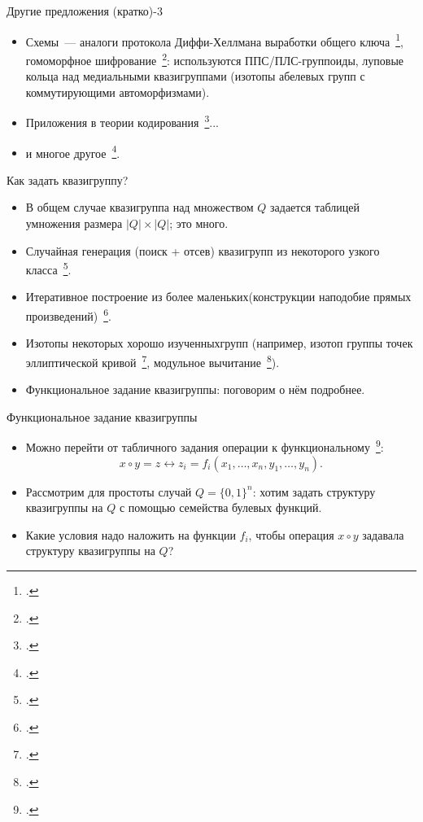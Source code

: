 \begin{frame}{Другие предложения (кратко)-3}
    \begin{itemize}
        \item Схемы~--- аналоги протокола Диффи-Хеллмана выработки общего ключа~\footcite{katyshev14, katyshev18}, гомоморфное шифрование~\footcite{gribov2010construction, gribov15, markov20}: используются ППС/ПЛС-группоиды, луповые кольца над медиальными квазигруппами (изотопы абелевых групп с коммутирующими автоморфизмами).
        \pause
        \item Приложения в теории кодирования~\footcite{nechaev98, nechaev04, couselo2004loop, markov12, markov2020nonassociative}...
        \pause 
        \item и многое другое~\footcite{glukhov, artamonov18, shcherbacov2017elements}.
    \end{itemize}
\end{frame}


\begin{frame}{Как задать квазигруппу?}
    \begin{itemize}
        \item В общем случае квазигруппа над множеством $Q$ задается таблицей умножения размера $\lvert Q \rvert \times \lvert Q \rvert$; это много.
        \pause 
        \item Случайная генерация (поиск + отсев) квазигрупп из некоторого узкого класса~\footcite{gligoroski2008public, chen2010multivariate}.
        \pause 
        \item Итеративное построение из более \guillemotleft маленьких\guillemotright (конструкции наподобие прямых произведений)~\footcite{gribovphd, EdonRprime}.
        \pause 
        \item Изотопы некоторых \guillemotleft хорошо изученных\guillemotright групп (например, изотоп группы точек эллиптической кривой~\footcite{DH16}, модульное вычитание~\footcite{snavsel2009hash}).
        \pause 
        \item Функциональное задание квазигруппы: поговорим о нём подробнее.
    \end{itemize}
\end{frame}


\begin{frame}{Функциональное задание квазигруппы}
    \begin{itemize}
        \item Можно перейти от табличного задания операции к функциональному~\footcite{nosov08}: 
        \[
            x \circ y = z \leftrightarrow z_i = f_i(x_1, \ldots, x_n, y_1, \ldots, y_n). 
        \]
        \pause 
        \item Рассмотрим для простоты случай $Q = \{0, 1\}^n$: хотим задать структуру квазигруппы на $Q$ с помощью семейства булевых функций.
        \pause 
        \item Какие условия надо наложить на функции $f_i$, чтобы операция $x \circ y$ задавала структуру квазигруппы на $Q$?
    \end{itemize}
\end{frame}


